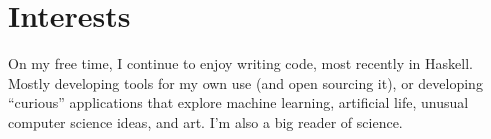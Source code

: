 \documentclass[a4paper,10pt]{article}
\begin{document}
\section{Interests}

 On my free time, I continue to enjoy writing code, most recently in Haskell.
 Mostly developing tools for my own use (and open sourcing it), or developing
 ``curious'' applications that explore machine learning, artificial life,
 unusual computer science ideas, and art. I'm also a big reader of science.


\end{document}
